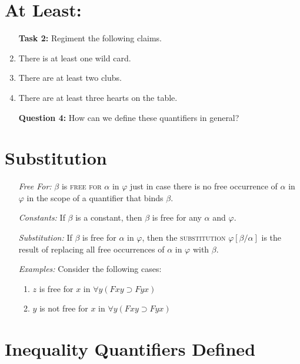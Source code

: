 \documentclass[a4paper, 11pt]{article} %
\newcommand{\qt}[2]{#1 #2} %
\newcommand{\unisub}[2]{[#1/#2]}
\begin{document}
\section*{At Least:}

\begin{enumerate}
  \item[\bf Task 2:] Regiment the following claims.
  \item There is at least one wild card.
  \item There are at least two clubs.
  \item There are at least three hearts on the table.
  \item[\bf Question 4:] How can we define these quantifiers in general?
\end{enumerate}





\section*{Substitution}

\begin{enumerate}
  \item[\it Free For:] $\beta$ is \textsc{free for} $\alpha$ in $\varphi$ just in case there is no free occurrence of $\alpha$ in $\varphi$ in the scope of a quantifier that binds $\beta$. 
  \item[\it Constants:] If $\beta$ is a constant, then $\beta$ is free for any $\alpha$ and $\varphi$. 
  \item[\it Substitution:] If $\beta$ is free for $\alpha$ in $\varphi$, then the \textsc{substitution} $\varphi\unisub{\beta}{\alpha}$ is the result of replacing all free occurrences of $\alpha$ in $\varphi$ with $\beta$. 
  \item[\it Examples:] Consider the following cases:
    \begin{enumerate}
      \item $z$ is free for $x$ in $\qt{\forall}{y}(Fxy \supset Fyx)$ 
      \item $y$ is not free for $x$ in $\qt{\forall}{y}(Fxy \supset Fyx)$
    \end{enumerate}
\end{enumerate}
   




\section*{Inequality Quantifiers Defined}
\end{document}
